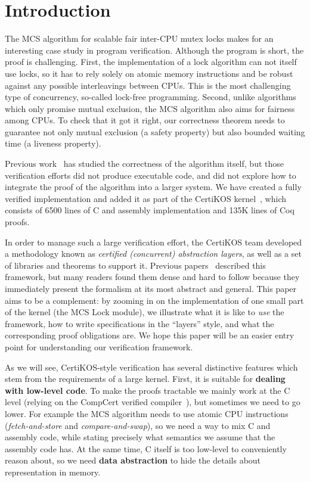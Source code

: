 \section{Introduction}
\label{sec:intro}

The MCS algorithm for scalable fair inter-CPU mutex locks makes for an interesting case study in program verification.
Although the program is short, the proof is challenging.
First, the implementation of a lock algorithm can not itself use locks, so it has to rely solely on atomic memory instructions and be robust against any possible interleavings between CPUs. This is the most challenging type of concurrency, so-called lock-free programming.
Second, unlike algorithms which only promise mutual exclusion, the MCS algorithm also aims for fairness among CPUs. To check that it got it right, our correctness theorem needs to guarantee not only mutual exclusion (a safety property) but also bounded waiting time (a liveness property).

Previous work~\cite{liang:lili,ogata:mcs-lock} has studied the
correctness of the algorithm itself, but those verification efforts
did not produce executable code, and did not explore how to integrate
the proof of the algorithm into a larger system. We have created a
fully verified implementation and added it as part of the CertiKOS
kernel~\cite{certikos16}, which consists of 6500 lines of C and
assembly implementation and 135K lines of Coq proofs.

In order to manage such a large verification effort, the CertiKOS team developed a methodology known as \emph{certified (concurrent) abstraction layers}, as well as a set of libraries and theorems to support it. Previous papers~\cite{dscal15,ccal16}
described this framework, but many readers found them  dense and hard to follow because they immediately present the formalism at its most abstract and general.
This paper aims to be a complement: by zooming in on the implementation of one small part of the kernel (the MCS Lock module), we illustrate  what it is like to \emph{use} the framework, how to write specifications in the ``layers'' style, and what the corresponding proof obligations are. We hope this paper will be an easier entry point for understanding our verification framework.

As we will see, CertiKOS-style verification has several distinctive features which stem from the requirements of a large kernel. First, it is suitable for {\bf dealing with low-level code}. To make the proofs tractable we mainly work at the C level (relying on the CompCert verified compiler~\cite{Leroy-Compcert-CACM}), but sometimes we need to go lower. For example the MCS algorithm needs to use atomic CPU instructions ({\em fetch-and-store} and {\em compare-and-swap}), so we need a way to  mix C and assembly code, while stating precisely what semantics we assume that the assembly code has. At the same time, C itself is too low-level to conveniently reason about, so we need {\bf data abstraction} to hide the details about representation in memory.

